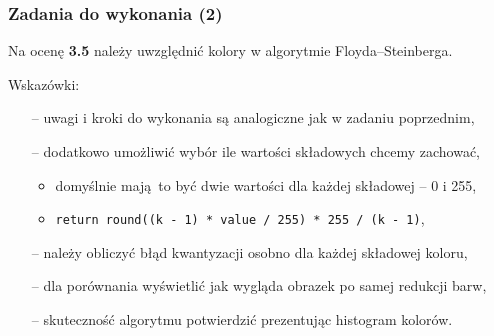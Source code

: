 \documentclass[usenames,dvipsnames,aspectratio=43,presentation]{beamer}
\begin{document}
    \begin{frame}
        \frametitle{Zadania do wykonania (2)}
        \footnotesize

        Na ocenę \textbf{3.5} należy uwzględnić kolory w algorytmie Floyda–Steinberga.

        \vfill

        Wskazówki:
        \begin{itemize}
            \setlength{\itemsep}{0.5em}
            \item[--] uwagi i kroki do wykonania są analogiczne jak w zadaniu poprzednim,
            \item[--] dodatkowo umożliwić wybór ile wartości składowych chcemy zachować,
                      \begin{itemize}
                          \setlength{\itemsep}{0.25em}
                          \scriptsize
                          \item domyślnie mają to być dwie wartości dla każdej składowej – 0 i 255,
                          \item \texttt{return round((k - 1) * value / 255) * 255 / (k - 1)},
                      \end{itemize}
            \item[--] należy obliczyć błąd kwantyzacji osobno dla każdej składowej koloru,
            \item[--] dla porównania wyświetlić jak wygląda obrazek po samej redukcji barw,
            \item[--] skuteczność algorytmu potwierdzić prezentując histogram kolorów.
        \end{itemize}
    \end{frame}
\end{document}
